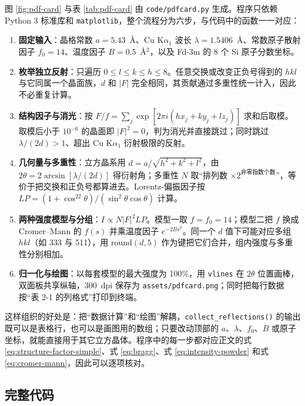     图 \ref{fig:pdf-card} 与表 \ref{tab:pdf-card} 由 \texttt{code/pdfcard.py} 生成。程序只依赖 Python 3 标准库和 \texttt{matplotlib}，整个流程分为六步，与代码中的函数一一对应：

    \begin{enumerate}[label=（\arabic*）,leftmargin=2.2em,itemsep=2pt]
      \item \textbf{固定输入}：晶格常数 $a=5.43$~\AA、Cu K$\alpha_1$ 波长 $\lambda=1.5406$~\AA、常数原子散射因子 $f_0=14$、温度因子 $B=0.5$~\AA$^2$，以及 Fd-3m 的 8 个 Si 原子分数坐标。
      \item \textbf{枚举独立反射}：只遍历 $0\le l\le k\le h\le 8$。任意交换或改变正负号得到的 $hkl$ 与它同属一个晶面族，$d$ 和 $|F|$ 完全相同，其贡献通过多重性统一计入，因此不必重复计算。
      \item \textbf{结构因子与消光}：按 $F/f=\sum_j\exp[2\pi i(hx_j+ky_j+lz_j)]$ 求和后取模。取模后小于 $10^{-6}$ 的晶面即 $|F|^2=0$，判为消光并直接跳过；同时跳过 $\lambda/(2d)>1$、超出 Cu K$\alpha_1$ 衍射极限的反射。
      \item \textbf{几何量与多重性}：立方晶系用 $d=a/\sqrt{h^2+k^2+l^2}$，由 $2\theta=2\arcsin[\lambda/(2d)]$ 得衍射角；多重性 $N$ 取“排列数 $\times2^{\text{非零指数个数}}$”，等价于把交换和正负号都算进去。Lorentz-偏振因子按 $LP=(1+\cos^22\theta)/(\sin^2\theta\cos\theta)$ 计算。
      \item \textbf{两种强度模型与分组}：$I\propto N|F|^2LP$。模型一取 $f=f_0=14$；模型二把 $f$ 换成 Cromer--Mann 的 $f(s)$ 并乘温度因子 $e^{-2Bs^2}$。同一个 $d$ 值下可能对应多组 $hkl$（如 333 与 511），用 $\mathrm{round}(d,5)$ 作为键把它们合并，组内强度与多重性分别相加。
      \item \textbf{归一化与绘图}：以每套模型的最大强度为 100\%，用 \texttt{vlines} 在 $2\theta$ 位置画棒，双面板共享纵轴，300~dpi 保存为 \texttt{assets/pdfcard.png}；同时把每行数据按“表 2-1 的列格式”打印到终端。
    \end{enumerate}

    这样组织的好处是：把“数据计算”和“绘图”解耦，\texttt{collect\_reflections()} 的输出既可以是表格行，也可以是画图用的数组；只要改动顶部的 $a$、$\lambda$、$f_0$、$B$ 或原子坐标，就能直接用于其它立方晶体。程序中的每一步都对应正文的式 \eqref{eq:structure-factor-simple}、式 \eqref{eq:bragg}、式 \eqref{eq:intensity-powder} 和式 \eqref{eq:cromer-mann}，因此可以逐项核对。

    \subsection{完整代码}

